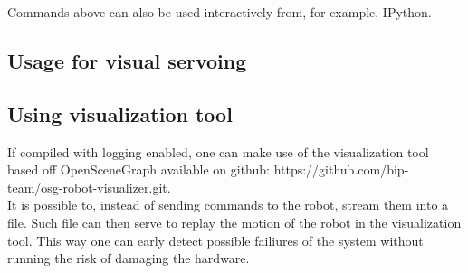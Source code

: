 \noindent Commands above can also be used interactively from, for example, IPython.

\subsection{Usage for visual servoing}

\subsection{Using visualization tool}
\noindent If compiled with logging enabled, one can make use of the visualization tool based off OpenSceneGraph
available on github: https://github.com/bip-team/osg-robot-visualizer.git. \\
\noindent It is possible to, instead of sending commands to the robot, stream them into a file. Such file can then serve
to replay the motion of the robot in the visualization tool. This way one can early detect possible failiures of the
system without running the risk of damaging the hardware.


